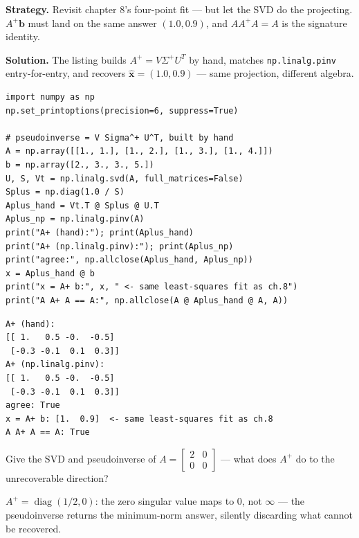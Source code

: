 \begin{example}\label{ex:pinv}
\textbf{Strategy.} Revisit chapter 8's four-point fit --- but let the SVD
do the projecting. $A^{+}\mathbf b$ must land on the same answer
$(1.0,0.9)$, and $AA^{+}A=A$ is the signature identity.

\textbf{Solution.} The listing builds $A^{+}=V\Sigma^{+}U^{T}$ by hand,
matches \texttt{np.linalg.pinv} entry-for-entry, and recovers
$\hat{\mathbf x}=(1.0,0.9)$ --- same projection, different algebra.
\end{example}

\begin{lstlisting}[caption={\ttfamily code/ch10\_pinv.py --- the
pseudoinverse assembled by hand, checked on the chapter-8 fit.}]
import numpy as np
np.set_printoptions(precision=6, suppress=True)

# pseudoinverse = V Sigma^+ U^T, built by hand
A = np.array([[1., 1.], [1., 2.], [1., 3.], [1., 4.]])
b = np.array([2., 3., 3., 5.])
U, S, Vt = np.linalg.svd(A, full_matrices=False)
Splus = np.diag(1.0 / S)
Aplus_hand = Vt.T @ Splus @ U.T
Aplus_np = np.linalg.pinv(A)
print("A+ (hand):"); print(Aplus_hand)
print("A+ (np.linalg.pinv):"); print(Aplus_np)
print("agree:", np.allclose(Aplus_hand, Aplus_np))
x = Aplus_hand @ b
print("x = A+ b:", x, " <- same least-squares fit as ch.8")
print("A A+ A == A:", np.allclose(A @ Aplus_hand @ A, A))
\end{lstlisting}

\begin{lstlisting}[caption={Output of the pseudoinverse check. Notice
$A^{+}\mathbf b$ reproduces the normal-equations fit $(1.0,0.9)$ ---
least squares WAS the pseudoinverse all along.}]
A+ (hand):
[[ 1.   0.5 -0.  -0.5]
 [-0.3 -0.1  0.1  0.3]]
A+ (np.linalg.pinv):
[[ 1.   0.5 -0.  -0.5]
 [-0.3 -0.1  0.1  0.3]]
agree: True
x = A+ b: [1.  0.9]  <- same least-squares fit as ch.8
A A+ A == A: True
\end{lstlisting}

\begin{exercise}[medium]
Give the SVD and pseudoinverse of $A=\begin{bmatrix}2&0\\0&0\end{bmatrix}$
--- what does $A^{+}$ do to the unrecoverable direction?
\begin{solution}
$A^{+}=\operatorname{diag}(1/2,0)$: the zero singular value maps to 0,
not $\infty$ --- the pseudoinverse returns the minimum-norm answer,
silently discarding what cannot be recovered.
\end{solution}
\end{exercise}

